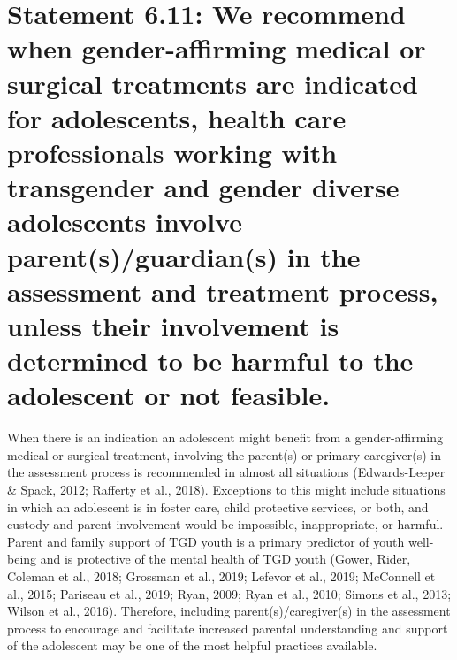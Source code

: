 \documentclass[
]{book}
\begin{document}
\hypertarget{statement-6.11-we-recommend-when-gender-affirming-medical-or-surgical-treatments-are-indicated-for-adolescents-health-care-professionals-working-with-transgender-and-gender-diverse-adolescents-involve-parentsguardians-in-the-assessment-and-treatment-process-unless-their-involvement-is-determined-to-be-harmful-to-the-adolescent-or-not-feasible.}{%
\section*{Statement 6.11: We recommend when gender-affirming medical or surgical treatments are indicated for adolescents, health care professionals working with transgender and gender diverse adolescents involve parent(s)/guardian(s) in the assessment and treatment process, unless their involvement is determined to be harmful to the adolescent or not feasible.}\label{statement-6.11-we-recommend-when-gender-affirming-medical-or-surgical-treatments-are-indicated-for-adolescents-health-care-professionals-working-with-transgender-and-gender-diverse-adolescents-involve-parentsguardians-in-the-assessment-and-treatment-process-unless-their-involvement-is-determined-to-be-harmful-to-the-adolescent-or-not-feasible.}}

When there is an indication an adolescent
might benefit from a gender-affirming medical
or surgical treatment, involving the parent(s) or
primary caregiver(s) in the assessment process is
recommended in almost all situations
(Edwards-Leeper \& Spack, 2012; Rafferty et al.,
2018). Exceptions to this might include situations
in which an adolescent is in foster care, child
protective services, or both, and custody and parent involvement would be impossible, inappropriate, or harmful. Parent and family support of
TGD youth is a primary predictor of youth
well-being and is protective of the mental health
of TGD youth (Gower, Rider, Coleman et al.,
2018; Grossman et al., 2019; Lefevor et al., 2019;
McConnell et al., 2015; Pariseau et al., 2019;
Ryan, 2009; Ryan et al., 2010; Simons et al., 2013;
Wilson et al., 2016). Therefore, including
parent(s)/caregiver(s) in the assessment process
to encourage and facilitate increased parental
understanding and support of the adolescent may
be one of the most helpful practices available.
\end{document}
